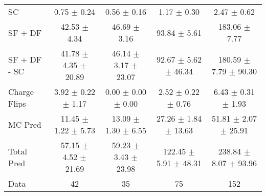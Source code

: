 \begin{tabular}{l|cccc}
                                 SC &  0.75 $\pm$  0.24 &  0.56 $\pm$  0.16 &  1.17 $\pm$  0.30 &  2.47 $\pm$  0.62 \\
                            SF + DF & 42.53 $\pm$  4.34 & 46.69 $\pm$  3.16 & 93.84 $\pm$  5.61 & 183.06 $\pm$  7.77 \\
\hline
                       SF + DF - SC & 41.78 $\pm$  4.35 $\pm$ 20.89 & 46.14 $\pm$  3.17 $\pm$ 23.07 & 92.67 $\pm$  5.62 $\pm$ 46.34 & 180.59 $\pm$  7.79 $\pm$ 90.30 \\
\hline\hline
                       Charge Flips &  3.92 $\pm$  0.22 $\pm$  1.17 &  0.00 $\pm$  0.00 $\pm$  0.00 &  2.52 $\pm$  0.22 $\pm$  0.76 &  6.43 $\pm$  0.31 $\pm$  1.93 \\
\hline
                            MC Pred & 11.45 $\pm$  1.22 $\pm$  5.73 & 13.09 $\pm$  1.30 $\pm$  6.55 & 27.26 $\pm$  1.84 $\pm$ 13.63 & 51.81 $\pm$  2.07 $\pm$ 25.91 \\
\hline
                         Total Pred & 57.15 $\pm$  4.52 $\pm$ 21.69 & 59.23 $\pm$  3.43 $\pm$ 23.98 & 122.45 $\pm$  5.91 $\pm$ 48.31 & 238.84 $\pm$  8.07 $\pm$ 93.96 \\
\hline\hline
                               Data &    42 &    35 &    75 &   152 \\
\hline\hline
\end{tabular}

